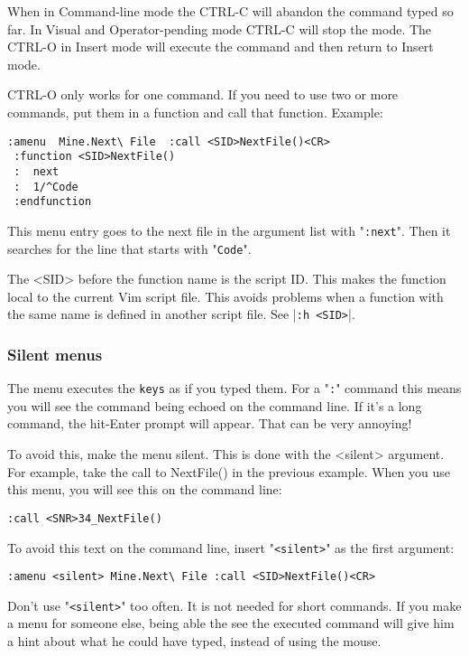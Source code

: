 When in Command-line mode the CTRL-C will abandon the command typed so far.
In Visual and Operator-pending mode CTRL-C will stop the mode.
The CTRL-O in Insert mode will execute the command and then return to Insert mode.

CTRL-O only works for one command.
If you need to use two or more commands, put them in a function and call that function.
Example:

\begin{Verbatim}[samepage=true]
 :amenu  Mine.Next\ File  :call <SID>NextFile()<CR>
 :function <SID>NextFile()
 :  next
 :  1/^Code
 :endfunction
\end{Verbatim}

This menu entry goes to the next file in the argument list with "\texttt{:next}".
Then it searches for the line that starts with "\texttt{Code}".

The <SID> before the function name is the script ID.
This makes the function local to the current Vim script file.
This avoids problems when a function with the same name is defined in another script file.
See |\texttt{:h <SID>}|.

\subsubsection{Silent menus}
The menu executes the \texttt{{keys}} as if you typed them.
For a "\texttt{:}" command this means you will see the command being echoed on the command line.
If it's a long command, the hit-Enter prompt will appear.
That can be very annoying!

To avoid this, make the menu silent.
This is done with the <silent> argument.
For example, take the call to NextFile() in the previous example.
When you use this menu, you will see this on the command line:

\begin{Verbatim}[samepage=true]
    :call <SNR>34_NextFile() 
\end{Verbatim}

To avoid this text on the command line, insert "\texttt{<silent>}" as the first argument:

\begin{Verbatim}[samepage=true]
 :amenu <silent> Mine.Next\ File :call <SID>NextFile()<CR>
\end{Verbatim}

Don't use "\texttt{<silent>}" too often.
It is not needed for short commands.
If you make a menu for someone else, being able the see the executed command will give him a hint about what he could have typed, instead of using the mouse.

